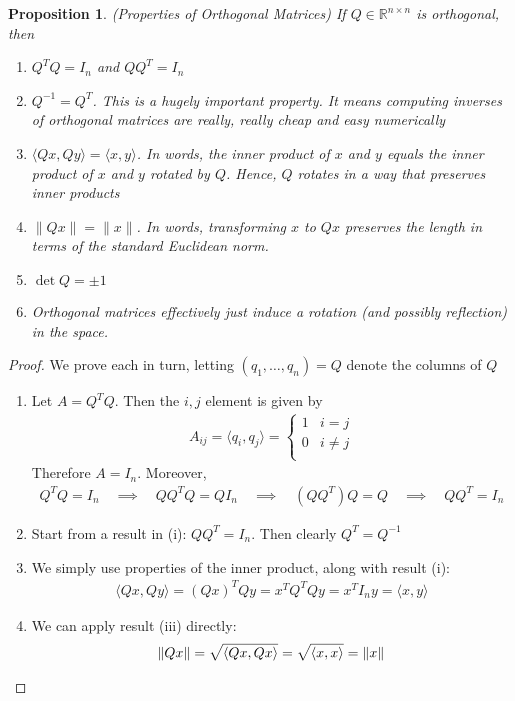 \documentclass[12pt]{article}
\numberwithin{equation}{section} %
\theoremstyle{plain}
\newtheorem{prop}[thm]{Proposition}
\theoremstyle{definition}
\theoremstyle{remark}
\newcommand{\Rnn}{\mathbb{R}^{n\times n}}
\begin{document}
\begin{prop}\emph{(Properties of Orthogonal Matrices)}
If $Q\in\Rnn$ is orthogonal, then
\begin{enumerate}[label=\emph{(\roman*)}]
  \item $Q^TQ=I_n$ and $QQ^T=I_n$
  \item $Q^{-1}=Q^T$. This is a hugely important property. It means
    computing inverses of orthogonal matrices are really, really cheap
    and easy numerically
  \item $\langle Qx, Qy \rangle=\langle x, y \rangle$. In words,
    the inner product of $x$ and $y$ equals the inner product of $x$ and
    $y$ rotated by $Q$. Hence, $Q$ rotates in a way that preserves inner
    products
  \item $\lVert Qx \rVert =\lVert x\rVert$.
    In words, transforming $x$ to $Qx$ preserves the length in terms of
    the standard Euclidean norm.
  \item $\det Q = \pm 1$
  \item Orthogonal matrices effectively just induce a rotation (and
    possibly reflection) in the space.
\end{enumerate}
\end{prop}
\begin{proof}
We prove each in turn, letting $(q_1,\ldots,q_n)=Q$ denote the columns
of $Q$
\begin{enumerate}[label=(\roman*)]
  \item Let $A=Q^TQ$. Then the $i,j$ element is given by
    \begin{align*}
      A_{ij} = \langle q_i, q_j\rangle
      = \begin{cases}
          1 & i=j \\
          0 & i\neq j \\
        \end{cases}
    \end{align*}
    Therefore $A=I_n$. Moreover,
    \begin{align*}
      Q^TQ = I_n
      \quad\implies\quad
      QQ^TQ = Q I_n
      \quad\implies\quad
      (QQ^T)Q = Q
      \quad\implies\quad
      QQ^T=I_n
    \end{align*}

  \item
    Start from a result in (i): $QQ^T = I_n$. Then clearly
    $Q^T = Q^{-1}$
  \item
    We simply use properties of the inner product, along with result
    (i):
    \begin{align*}
      \langle Qx, Qy \rangle
      =
      (Qx)^T Qy
      = x^T Q^TQ y = x^T I_n y = \langle x, y\rangle
    \end{align*}
  \item
    We can apply result (iii) directly:
    \begin{align*}
      \lVert Qx\rVert
      =
      \sqrt{%
      \langle Qx,Qx\rangle
      }
      =
      \sqrt{%
      \langle x,x\rangle
      }
      = \lVert x\rVert
    \end{align*}
\end{enumerate}
\end{proof}
\end{document}
